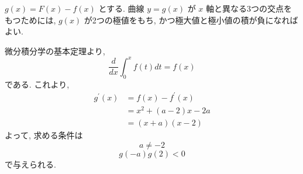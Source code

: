 \documentclass[a4j, 11pt]{jarticle}
\begin{document}
 
 $g(x) = F(x) - f(x)$ とする. 曲線 $y = g(x)$ が $x$ 軸と異なる3つの交点をもつためには,  
 $g(x)$ が2つの極値をもち, かつ極大値と極小値の積が負になればよい.  \par

微分積分学の基本定理より, 
 \begin{equation*}
  \frac{d}{dx}\int_{0}^{x} f(t) dt =  f(x)
 \end{equation*}
である. これより, 
 \begin{align*}
  g^{'}(x) &= f(x) - f^{'}(x)   \\
           &= x^2 + (a - 2)x - 2a \\
           &= (x + a)(x - 2)
 \end{align*}
よって, 求める条件は
 \begin{equation}
  a \neq -2
 \end{equation}
 \begin{equation}
  g(-a)g(2) < 0
 \end{equation}
で与えられる. 


 
\end{document}
